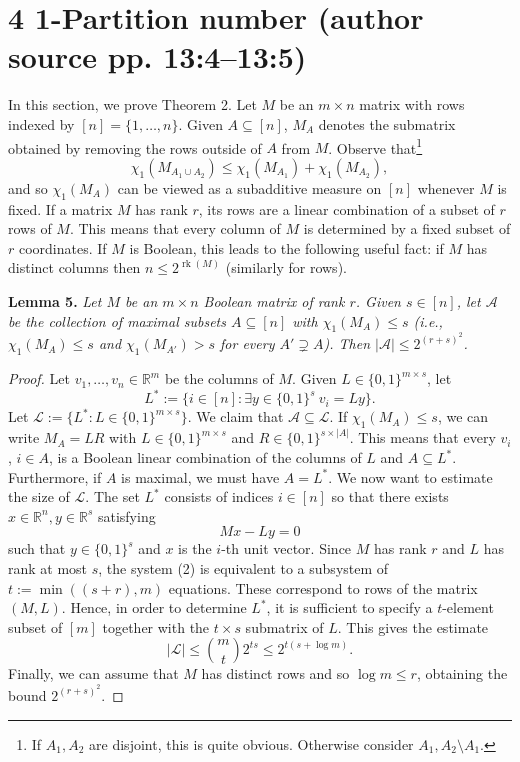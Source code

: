 \documentclass[10pt,a4paper]{article}
\newcommand{\rk}{\operatorname{rk}}
\newcommand{\RR}{\mathbb R}
\newenvironment{originalresult}[1]{\par\medskip\noindent\textbf{#1.}\itshape}{\par\medskip}
\begin{document}
\section*{4 1-Partition number (author source pp. 13:4--13:5)}
In this section, we prove Theorem 2.
Let $M$ be an $m\times n$ matrix with rows indexed by $[n]=\{1,\ldots,n\}$. Given $A\subseteq[n]$, $M_A$ denotes the submatrix obtained by removing the rows outside of $A$ from $M$. Observe that\footnote{If $A_1,A_2$ are disjoint, this is quite obvious. Otherwise consider $A_1,A_2\setminus A_1$.}
\[\chi_1(M_{A_1\cup A_2})\le\chi_1(M_{A_1})+\chi_1(M_{A_2}),\tag{1}\]
and so $\chi_1(M_A)$ can be viewed as a subadditive measure on $[n]$ whenever $M$ is fixed.
If a matrix $M$ has rank $r$, its rows are a linear combination of a subset of $r$ rows of $M$. This means that every column of $M$ is determined by a fixed subset of $r$ coordinates. If $M$ is Boolean, this leads to the following useful fact:
if $M$ has distinct columns then $n\le 2^{\rk(M)}$ (similarly for rows).
\begin{originalresult}{Lemma 5}
Let $M$ be an $m\times n$ Boolean matrix of rank $r$. Given $s\in[n]$, let $\mathcal A$ be the collection of maximal subsets $A\subseteq[n]$ with $\chi_1(M_A)\le s$ (i.e., $\chi_1(M_A)\le s$ and $\chi_1(M_{A'})>s$ for every $A'\supsetneq A$). Then $|\mathcal A|\le 2^{(r+s)^2}$.
\end{originalresult}
\begin{proof}
Let $v_1,\ldots,v_n\in\RR^m$ be the columns of $M$. Given $L\in\{0,1\}^{m\times s}$, let
\[L^*:=\{i\in[n]:\exists y\in\{0,1\}^s\ v_i=Ly\}.\]
Let $\mathcal L:=\{L^*:L\in\{0,1\}^{m\times s}\}$.
We claim that $\mathcal A\subseteq\mathcal L$. If $\chi_1(M_A)\le s$, we can write $M_A=LR$ with $L\in\{0,1\}^{m\times s}$ and $R\in\{0,1\}^{s\times|A|}$. This means that every $v_i$, $i\in A$, is a Boolean linear combination of the columns of $L$ and $A\subseteq L^*$. Furthermore, if $A$ is maximal, we must have $A=L^*$.
We now want to estimate the size of $\mathcal L$. The set $L^*$ consists of indices $i\in[n]$ so that there exists $x\in\RR^n,y\in\RR^s$ satisfying
\[Mx-Ly=0\tag{2}\]
such that $y\in\{0,1\}^s$ and $x$ is the $i$-th unit vector. Since $M$ has rank $r$ and $L$ has rank at most $s$, the system (2) is equivalent to a subsystem of $t:=\min((s+r),m)$ equations. These correspond to rows of the matrix $(M,L)$. Hence, in order to determine $L^*$, it is sufficient to specify a $t$-element subset of $[m]$ together with the $t\times s$ submatrix of $L$. This gives the estimate
\[|\mathcal L|\le\binom mt2^{ts}\le2^{t(s+\log m)}.\]
Finally, we can assume that $M$ has distinct rows and so $\log m\le r$, obtaining the bound $2^{(r+s)^2}$.
\end{proof}
\end{document}

